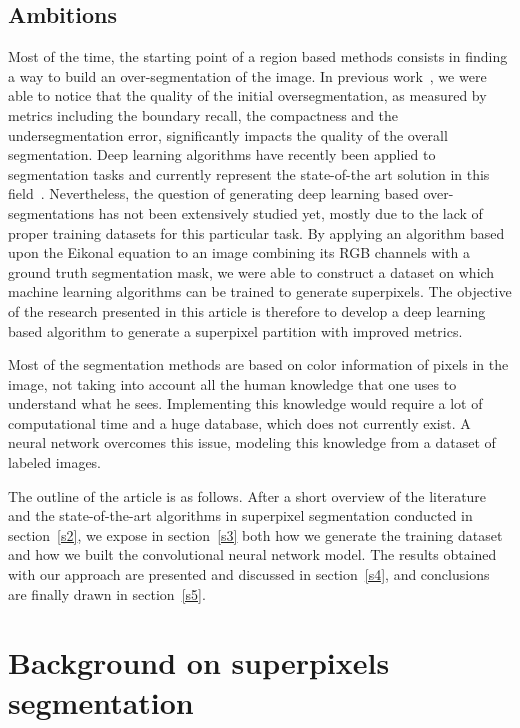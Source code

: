 \documentclass{article}
\begin{document}
    \subsection{Ambitions}
        Most of the time, the starting point of a region based methods consists in finding a way to build an over-segmentation of the image. In previous work~\cite{chang2019}, we were able to notice that the quality of the initial oversegmentation, as measured by metrics including the boundary recall, the compactness and the undersegmentation error, significantly impacts the quality of the overall segmentation.
        Deep learning algorithms have recently been applied to segmentation tasks and currently represent the state-of-the art solution in this field~\cite{unet2015,long2015}. Nevertheless, the question of generating deep learning based over-segmentations has not been extensively studied yet, mostly due to the lack of proper training datasets for this particular task. By applying an algorithm based upon the Eikonal equation to an image combining its RGB channels with a ground truth segmentation mask, we were able to construct a dataset on which machine learning algorithms can be trained to generate superpixels.
        The objective of the research presented in this article is therefore to develop a deep learning based algorithm to generate a superpixel partition with improved metrics.
        \par
        Most of the segmentation methods are based on color information of pixels in the image, not taking into account all the human knowledge that one uses to understand what he sees. Implementing this knowledge would require a lot of computational time and a huge database, which does not currently exist. A neural network overcomes this issue, modeling this knowledge from a dataset of labeled images.
        \par
        The outline of the article is as follows. After a short overview of the literature and the state-of-the-art algorithms in superpixel segmentation conducted in section~\ref{s2}, we expose in section~\ref{s3} both how we generate the training dataset and how we built the convolutional neural network model. The results obtained with our approach are presented and discussed in section~\ref{s4}, and conclusions are finally drawn in section~\ref{s5}.

\newpage
\section{Background on superpixels segmentation\label{s2}}
\end{document}
